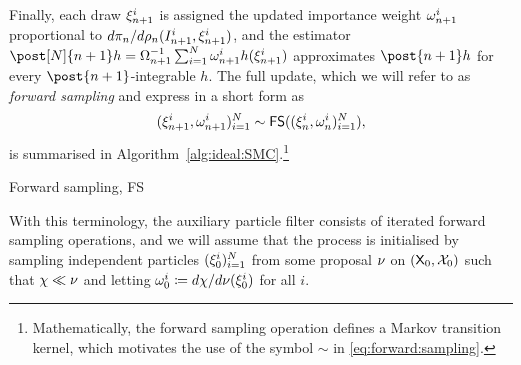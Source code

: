 Finally, each draw $\xi_{n + 1}^{i}$ is assigned the updated importance weight $\omega_{n + 1}^{i}$ proportional to $d \pi_n / d \rho_n (I_{n + 1}^{i}, \xi_{n + 1}^{i})$, and the estimator $\post[\N]{n + 1} h = \sumwght{n + 1}^{-1} \sum_{i = 1}^\N \ewght{n + 1}{i} h(\epart{n + 1}{i})$ approximates $\post{n + 1} h$ for every $\post{n + 1}$-integrable $h$. The full update, which we will refer to as \emph{forward sampling} and express in a short form as
\begin{equation} \label{eq:forward:sampling}
    (\epart{n + 1}{i}, \ewght{n + 1}{i})_{i = 1}^\N \sim \mathsf{FS}((\epart{n}{i}, \ewght{n}{i})_{i = 1}^\N),   
\end{equation}
is summarised in Algorithm~\ref{alg:ideal:SMC}.\footnote{Mathematically, the forward sampling operation defines a Markov transition kernel, which motivates the use of the symbol $\sim$ in \eqref{eq:forward:sampling}.} 

\begin{algorithm}[h] 
\caption{Forward sampling, \textsf{FS}} \label{alg:ideal:SMC}
\end{algorithm}

With this terminology, the auxiliary particle filter consists of iterated forward sampling operations, and we will assume that the process is initialised by sampling independent particles $(\xi_{0}^{i})_{i = 1}^N$ from some proposal $\nu$ on $(\mathsf{X}_0, \mathcal{X}_0)$ such that $\chi \ll \nu$ and letting $\omega_{0}^{i} \coloneqq d \chi / d \nu(\xi_{0}^{i})$ for all $i$. 

